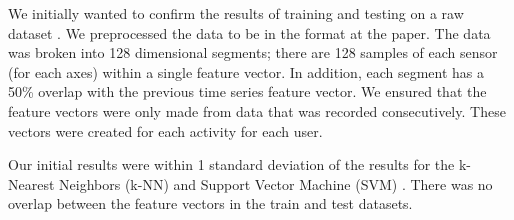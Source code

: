 We initially wanted to confirm the results of training and testing on a raw dataset \cite{ferrari2019hand}. We preprocessed the data to be in the format at the paper. The data was broken into 128 dimensional segments; there are 128 samples of each sensor (for each axes) within a single feature vector. In addition, each segment has a 50\% overlap with the previous time series feature vector. We ensured that the feature vectors were only made from data that was recorded consecutively. These vectors were created for each activity for each user.

Our initial results were within 1 standard deviation of the results for the k-Nearest Neighbors (k-NN) and Support Vector Machine (SVM)  \cite{ferrari2019hand}. There was no overlap between the feature vectors in the train and test datasets. 



